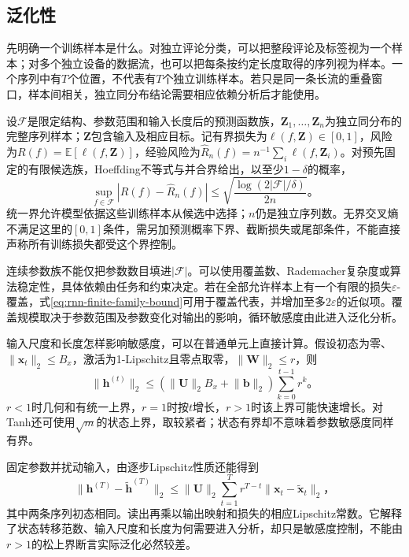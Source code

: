 \subsection{泛化性}
\label{sec:rnn-generalization}

先明确一个训练样本是什么。对独立评论分类，可以把整段评论及标签视为一个样本；对多个独立设备的数据流，也可以把每条按约定长度取得的序列视为样本。一个序列中有$T$个位置，不代表有$T$个独立训练样本。若只是同一条长流的重叠窗口，样本间相关，独立同分布结论需要相应依赖分析后才能使用。

设$\mathcal{F}$是限定结构、参数范围和输入长度后的预测函数族，$\bm{Z}_1,\ldots,\bm{Z}_n$为独立同分布的完整序列样本；$\bm{Z}$包含输入及相应目标。记有界损失为$\ell(f,\bm{Z})\in[0,1]$，风险为$R(f)=\mathbb{E}[\ell(f,\bm{Z})]$，经验风险为$\widehat R_n(f)=n^{-1}\sum_i\ell(f,\bm{Z}_i)$。对预先固定的有限候选族，Hoeffding不等式与并合界给出，以至少$1-\delta$的概率，
\begin{equation}
  \sup_{f\in\mathcal{F}}\left|R(f)-\widehat R_n(f)\right|
    \leq\sqrt{\frac{\log(2|\mathcal{F}|/\delta)}{2n}}\text{。}
  \label{eq:rnn-finite-family-bound}
\end{equation}
统一界允许模型依据这些训练样本从候选中选择；$n$仍是独立序列数。无界交叉熵不满足这里的$[0,1]$条件，需另加预测概率下界、截断损失或尾部条件，不能直接声称所有训练损失都受这个界控制。

连续参数族不能仅把参数数目填进$|\mathcal{F}|$。可以使用覆盖数、Rademacher复杂度或算法稳定性，具体依赖由任务和约束决定。若在全部允许样本上有一个有限的损失$\varepsilon$-覆盖，式\eqref{eq:rnn-finite-family-bound}可用于覆盖代表，并增加至多$2\varepsilon$的近似项。覆盖规模取决于参数范围及参数变化对输出的影响，循环敏感度由此进入泛化分析。

输入尺度和长度怎样影响敏感度，可以在普通单元上直接计算。假设初态为零、$\lVert\bm{x}_t\rVert_2\leq B_x$，激活为1-Lipschitz且零点取零，$\lVert\bm{W}\rVert_2\leq r$，则
\begin{equation}
  \lVert\bm{h}^{(t)}\rVert_2
    \leq\left(\lVert\bm{U}\rVert_2 B_x+\lVert\bm{b}\rVert_2\right)
       \sum_{k=0}^{t-1}r^k\text{。}
  \label{eq:rnn-state-norm-bound}
\end{equation}
$r<1$时几何和有统一上界，$r=1$时按$t$增长，$r>1$时该上界可能快速增长。对Tanh还可使用$\sqrt m$的状态上界，取较紧者；状态有界却不意味着参数敏感度同样有界。

固定参数并扰动输入，由逐步Lipschitz性质还能得到
\begin{equation}
  \lVert\bm{h}^{(T)}-\widetilde{\bm{h}}^{(T)}\rVert_2
    \leq\lVert\bm{U}\rVert_2
      \sum_{t=1}^{T}r^{T-t}\lVert\bm{x}_t-\widetilde{\bm{x}}_t\rVert_2\text{，}
  \label{eq:rnn-input-sensitivity}
\end{equation}
其中两条序列初态相同。读出再乘以输出映射和损失的相应Lipschitz常数。它解释了状态转移范数、输入尺度和长度为何需要进入分析，却只是敏感度控制，不能由$r>1$的松上界断言实际泛化必然较差。

